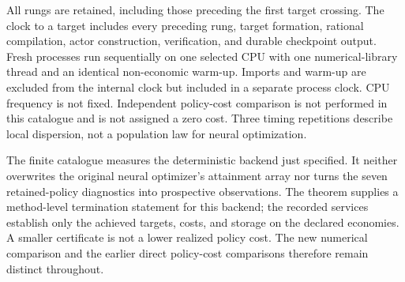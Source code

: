 All rungs are retained, including those preceding the first target crossing. The clock to a target includes every preceding rung, target formation, rational compilation, actor construction, verification, and durable checkpoint output. Fresh processes run sequentially on one selected CPU with one numerical-library thread and an identical non-economic warm-up. Imports and warm-up are excluded from the internal clock but included in a separate process clock. CPU frequency is not fixed. Independent policy-cost comparison is not performed in this catalogue and is not assigned a zero cost. Three timing repetitions describe local dispersion, not a population law for neural optimization.




The finite catalogue measures the deterministic backend just specified. It neither overwrites the original neural optimizer's attainment array nor turns the seven retained-policy diagnostics into prospective observations. The theorem supplies a method-level termination statement for this backend; the recorded services establish only the achieved targets, costs, and storage on the declared economies. A smaller certificate is not a lower realized policy cost. The new numerical comparison and the earlier direct policy-cost comparisons therefore remain distinct throughout.
